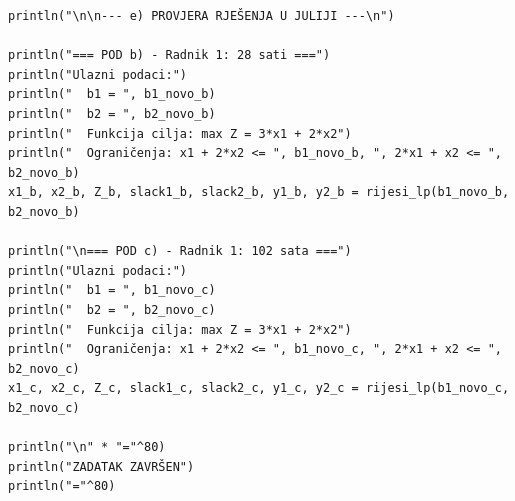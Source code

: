 \documentclass[12pt,a4paper]{article}
\begin{document}
\begin{lstlisting}[style=julia, caption={Julia kod za postoptimalnu analizu}]
println("\n\n--- e) PROVJERA RJEŠENJA U JULIJI ---\n")

println("=== POD b) - Radnik 1: 28 sati ===")
println("Ulazni podaci:")
println("  b1 = ", b1_novo_b)
println("  b2 = ", b2_novo_b)
println("  Funkcija cilja: max Z = 3*x1 + 2*x2")
println("  Ograničenja: x1 + 2*x2 <= ", b1_novo_b, ", 2*x1 + x2 <= ", b2_novo_b)
x1_b, x2_b, Z_b, slack1_b, slack2_b, y1_b, y2_b = rijesi_lp(b1_novo_b, b2_novo_b)

println("\n=== POD c) - Radnik 1: 102 sata ===")
println("Ulazni podaci:")
println("  b1 = ", b1_novo_c)
println("  b2 = ", b2_novo_c)
println("  Funkcija cilja: max Z = 3*x1 + 2*x2")
println("  Ograničenja: x1 + 2*x2 <= ", b1_novo_c, ", 2*x1 + x2 <= ", b2_novo_c)
x1_c, x2_c, Z_c, slack1_c, slack2_c, y1_c, y2_c = rijesi_lp(b1_novo_c, b2_novo_c)

println("\n" * "="^80)
println("ZADATAK ZAVRŠEN")
println("="^80)
\end{lstlisting}
\end{document}
